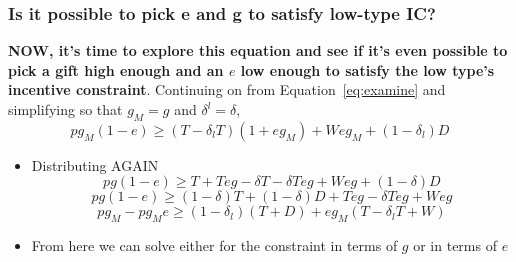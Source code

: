 \documentclass[12pt]{article}
\newcommand{\de}{\delta}
\begin{document}
\subsubsection{Is it possible to pick e and g to satisfy low-type IC?}

\textbf{NOW, it's time to explore this equation and see if it's even possible to pick a gift high enough and an $e$ low enough to satisfy the low type's incentive constraint}. Continuing on from Equation~\ref{eq:examine} and simplifying so that $g_M = g$ and $\de^l = \de$,
\[
	pg_M\left(1 - e\right) \geq \left(T - \de_l T \right) \left(1 + eg_M\right) + Weg_M + \left(1 - \de_l \right) D
\]
	\begin{itemize}
		\item Distributing AGAIN
			\[
				pg	\left(1 - e\right) \geq T + Teg - \de T - \de T eg + Weg + \left(1 - \de \right) D
			\]
			\[
				pg	\left(1 - e\right) \geq \left(1 - \de \right) T + \left(1 - \de \right) D + Teg - \de T eg + Weg
			\]
			\begin{equation}
				pg_M - pg_Me \geq \left(1 - \de_l \right) \left( T + D \right) + eg_M \left( T - \de_l T + W \right)
				\label{eq:split}
			\end{equation}
		\item From here we can solve either for the constraint in terms of $g$ or in terms of $e$
	\end{itemize}		
			
\end{document}
